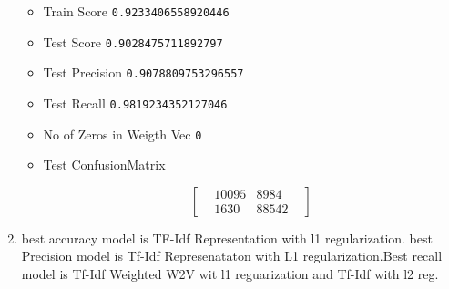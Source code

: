 \documentclass[11pt]{article}
\providecommand{\tightlist}{%
      \setlength{\itemsep}{0pt}\setlength{\parskip}{0pt}}
\begin{document}
\begin{enumerate}
  \begin{itemize}
  \tightlist
  \item
    Train Score \texttt{0.9233406558920446}
  \item
    Test Score \texttt{0.9028475711892797}
  \item
    Test Precision \texttt{0.9078809753296557}
  \item
    Test Recall \texttt{0.9819234352127046}
  \item
    No of Zeros in Weigth Vec \texttt{0}
  \item
    Test ConfusionMatrix

    \begin{equation}
    \begin{bmatrix}
    & 10095 & 8984 &  \\
    & 1630 & 88542 & 
    \end{bmatrix}
    \end{equation}
  \end{itemize}
\item
  best accuracy model is TF-Idf Representation with l1 regularization.
  best Precision model is Tf-Idf Represenataton with L1
  regularization.Best recall model is Tf-Idf Weighted W2V wit l1
  reguarization and Tf-Idf with l2 reg.
\end{enumerate}


    
    
    
    
\end{document}
